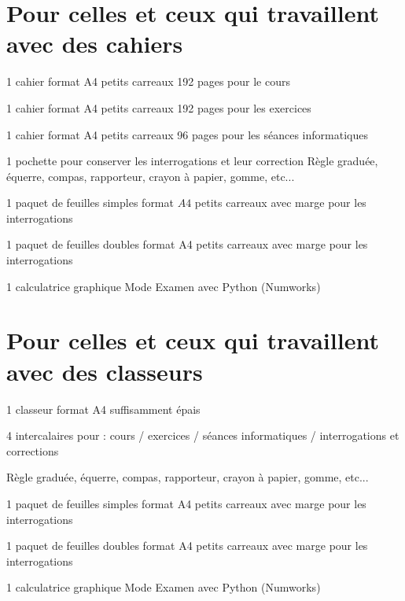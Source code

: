 \documentclass[11pt,a4paper]{article}  %
\begin{document}
	\begin{center}
	
\newpage	
\end{center}

\section*{Pour celles et ceux qui travaillent avec des cahiers}

\begin{itemMet}
	\item 1 cahier format A4 petits carreaux 192 pages pour le cours 
	\item 1 cahier format A4 petits carreaux 192 pages pour les exercices 
	\item 1 cahier format A4 petits carreaux 96 pages pour les séances informatiques 
	\item 1 pochette pour conserver les interrogations et leur correction Règle graduée, équerre, compas, rapporteur, crayon à papier, gomme, etc... 
	\item 1 paquet de feuilles simples format $A 4$ petits carreaux avec marge pour les interrogations 
	\item 1 paquet de feuilles doubles format A4 petits carreaux avec marge pour les interrogations 
	\item 1 calculatrice graphique Mode Examen avec Python (Numworks)
\end{itemMet}

\section*{Pour celles et ceux qui travaillent avec des classeurs}

\begin{itemMet}
	\item 1 classeur format A4 suffisamment épais
	\item 4 intercalaires pour : cours / exercices / séances informatiques / interrogations et corrections 
	\item Règle graduée, équerre, compas, rapporteur, crayon à papier, gomme, etc...
	\item 1 paquet de feuilles simples format A4 petits carreaux avec marge pour les interrogations
	\item 1 paquet de feuilles doubles format A4 petits carreaux avec marge pour les interrogations 
	\item 1 calculatrice graphique Mode Examen avec Python (Numworks)
\end{itemMet}
\end{document}
